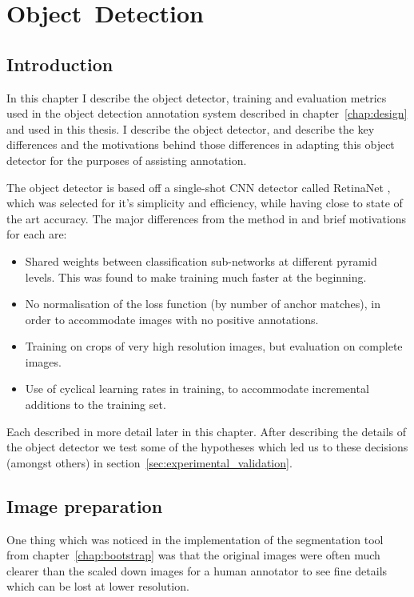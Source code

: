 \chapter{Object~Detection}
\label{chap:object_detection} 

\section{Introduction}

In this chapter I describe the object detector, training and evaluation metrics used in the object detection annotation system described in chapter~\ref{chap:design} and used in this thesis. I describe the object detector, and describe the key differences and the motivations behind those differences in adapting this object detector for the purposes of assisting annotation.

The object detector is based off a single-shot \gls{CNN} detector called RetinaNet \cite{Lin2017}, which was selected for it's simplicity and efficiency, while having close to state of the art accuracy. The major differences from the method in \cite{Lin2017} and brief motivations for each are:

\begin{itemize}
    \item Shared weights between classification sub-networks at different pyramid levels. This was found to make training much faster at the beginning.
    \item No normalisation of the loss function (by number of anchor matches), in order to accommodate images with no positive annotations.
    \item Training on crops of very high resolution images, but evaluation on complete images.
    \item Use of cyclical learning rates in training, to accommodate incremental additions to the training set.
\end{itemize}

Each described in more detail later in this chapter. After describing the details of the object detector we test some of the hypotheses which led us to these decisions (amongst others) in section~\ref{sec:experimental_validation}.

\section {Image preparation}

One thing which was noticed in the implementation of the segmentation tool from chapter~\ref{chap:bootstrap} was that the original images were often much clearer than the scaled down images for a human annotator to see fine details which can be lost at lower resolution. 

